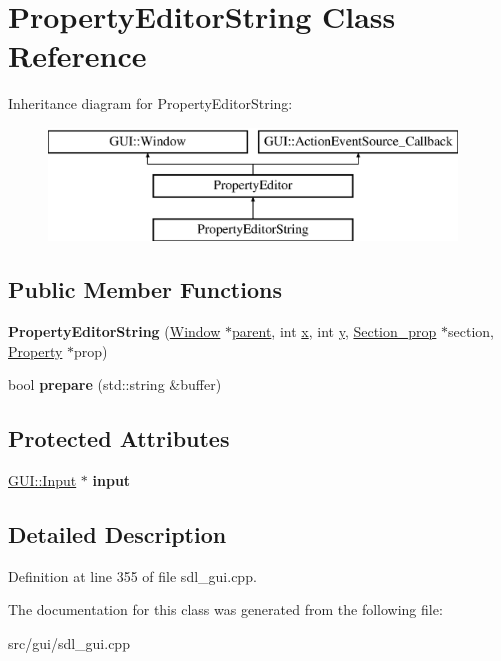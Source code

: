 \hypertarget{classPropertyEditorString}{\section{Property\-Editor\-String Class Reference}
\label{classPropertyEditorString}
}
Inheritance diagram for Property\-Editor\-String\-:\begin{figure}[H]
\begin{center}
\leavevmode
\includegraphics[height=3.000000cm]{classPropertyEditorString}
\end{center}
\end{figure}
\subsection*{Public Member Functions}
\begin{DoxyCompactItemize}
\item 
\hypertarget{classPropertyEditorString_a31b0d946bf3f3266c7c99db8c74e72c2}{{\bfseries Property\-Editor\-String} (\hyperlink{classGUI_1_1Window_ae828e9daa964dfc65a3550fb03117d30}{Window} $\ast$\hyperlink{classGUI_1_1Window_a2e593ff65e7702178d82fe9010a0b539}{parent}, int \hyperlink{classGUI_1_1Window_a6ca6a80ca00c9e1d8ceea8d3d99a657d}{x}, int \hyperlink{classGUI_1_1Window_a0ee8e923aff2c3661fc2e17656d37adf}{y}, \hyperlink{classSection__prop}{Section\-\_\-prop} $\ast$section, \hyperlink{classProperty}{Property} $\ast$prop)}\label{classPropertyEditorString_a31b0d946bf3f3266c7c99db8c74e72c2}

\item 
\hypertarget{classPropertyEditorString_a4653327f5d42f8b8146ecad5d1c9a53e}{bool {\bfseries prepare} (std\-::string \&buffer)}\label{classPropertyEditorString_a4653327f5d42f8b8146ecad5d1c9a53e}

\end{DoxyCompactItemize}
\subsection*{Protected Attributes}
\begin{DoxyCompactItemize}
\item 
\hypertarget{classPropertyEditorString_a01df4231c719d774740cc9dcb24682d5}{\hyperlink{classGUI_1_1Input}{G\-U\-I\-::\-Input} $\ast$ {\bfseries input}}\label{classPropertyEditorString_a01df4231c719d774740cc9dcb24682d5}

\end{DoxyCompactItemize}


\subsection{Detailed Description}


Definition at line 355 of file sdl\-\_\-gui.\-cpp.



The documentation for this class was generated from the following file\-:\begin{DoxyCompactItemize}
\item 
src/gui/sdl\-\_\-gui.\-cpp\end{DoxyCompactItemize}
